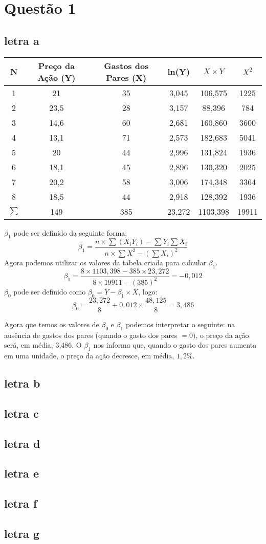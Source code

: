 \chapter{Questão 1}
\section*{letra a}
\begin{center}
    \begin{tabular}{|c|c|c|c|c|c|}
        \hline
        N & Preço da Ação (Y) & Gastos dos Pares (X) & ln(Y) & \(X \times Y\) & \(X^2\)  \\ \hline
        1 & 21 & 35 & 3,045 & 106,575 & 1225\\ \hline
        2 & 23,5 & 28 & 3,157 & 88,396 & 784\\ \hline
        3 & 14,6 & 60 & 2,681 & 160,860 & 3600\\ \hline
        4 & 13,1 & 71 & 2,573 & 182,683 & 5041\\ \hline
        5 & 20 & 44 & 2,996 & 131,824 & 1936\\ \hline
        6 & 18,1 & 45 & 2,896 & 130,320 & 2025\\ \hline
        7 & 20,2 & 58 & 3,006 & 174,348 & 3364\\ \hline
        8 & 18,5 & 44 & 2,918 & 128,392 & 1936\\ \hline
        \(\sum\) & 149 & 385 & 23,272 & 1103,398 & 19911\\ \hline
    \end{tabular}
\end{center}
\(\beta_{1}\) pode ser definido da seguinte forma:
\[\beta_{1} = \frac{n \times \sum (X_{i}Y_{i}) - \sum Y_{i}\sum X_{i}}{n \times \sum X^2 - (\sum X_{i})^2}\]
Agora podemos utilizar os valores da tabela criada para calcular \(\beta_{1}\).
\[ \beta_{1} = \frac{8 \times 1103,398 - 385 \times 23,272}{8 \times 19911 - (385)^2} = -0,012 \]
\(\beta_{0}\) pode ser definido como \(\beta_{0} = \bar{Y} - \beta_{1} \times \bar{X}\), logo:
\[ \beta_{0} = \frac{23,272}{8} + 0,012 \times \frac{48,125}{8} = 3,486 \]

Agora que temos os valores de \(\beta_{0}\) e \(\beta_{1}\) podemos interpretar o seguinte: na ausência de gastos dos pares (quando o gasto dos pares \(= 0)\), o preço da ação será, em média, 3,486. O \(\beta_{1}\) nos informa que, quando o gasto dos pares aumenta em uma unidade, o preço da ação decresce, em média, \(1,2\%\).
\section*{letra b}
\section*{letra c}
\section*{letra d}
\section*{letra e}
\section*{letra f}
\section*{letra g}

